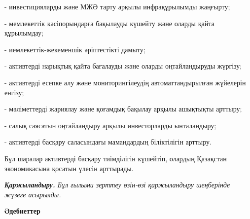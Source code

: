 \begin{multicols}{2}
- инвестицияларды және МЖӘ тарту арқылы инфрақұрылымды жаңғырту;

- мемлекеттік кәсіпорындарға бақылауды күшейту және оларды қайта
құрылымдау;

- иемлекеттік-жекеменшік әріптестікті дамыту;

- активтерді нарықтық қайта бағалауды және оларды оңтайландыруды
жүргізу;

- активтерді есепке алу және мониторингілеудің автоматтандырылған
жүйелерін енгізу;

- мәліметтерді жариялау және қоғамдық бақылау арқылы ашықтықты арттыру;

- салық саясатын оңтайландыру арқылы инвесторларды ынталандыру;

- активтерді басқару саласындағы мамандардың біліктілігін арттыру.

Бұл шаралар активтерді басқару тиімділігін күшейтіп, олардың Қазақстан
экономикасына қосатын үлесін арттырады.

\emph{{\bfseries Қаржыландыру.} Бұл ғылыми зерттеу өзін-өзі қаржыландыру
шеңберінде жүзеге асырылды.}
\end{multicols}

\begin{center}
{\bfseries Әдебиеттер}
\end{center}

